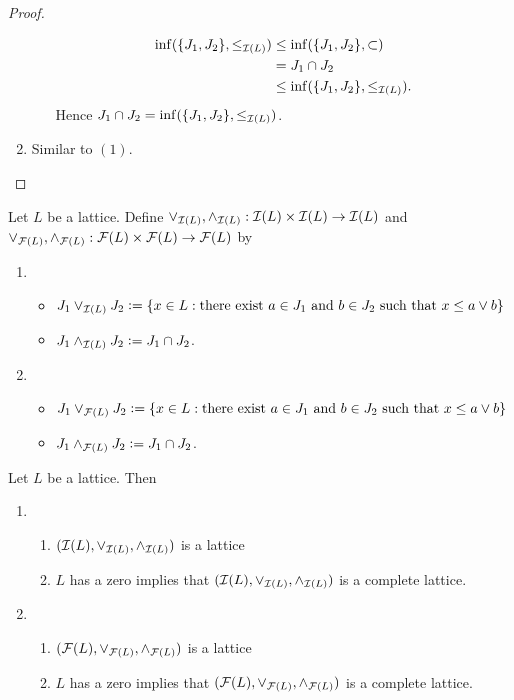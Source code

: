 \documentclass{book}
\begin{document}
\begin{proof}
\begin{enumerate}
\begin{enumerate}
				\begin{align*}
					\inf (\{J_1, J_2\}, \leq_{\mathcal{I}(L)})
					& \leq \inf (\{J_1, J_2\}, \subset) \\
					& = J_1 \cap J_2 \\
					& \leq \inf (\{J_1, J_2\}, \leq_{\mathcal{I}(L)}).
				\end{align*} 
				Hence $J_1 \cap J_2 = \inf (\{J_1, J_2\}, \leq_{\mathcal{I}(L)})$. 
			\end{enumerate}
			\item Similar to $(1)$.  
		\end{enumerate}
	\end{proof}
	
	\begin{defn}
		Let $L$ be a lattice. Define $\vee_{\mathcal{I}(L)}, \wedge_{\mathcal{I}(L)}: \mathcal{I}(L) \times \mathcal{I}(L) \rightarrow \mathcal{I}(L)$ and $\vee_{\mathcal{F}(L)}, \wedge_{\mathcal{F}(L)}: \mathcal{F}(L) \times \mathcal{F}(L) \rightarrow \mathcal{F}(L)$ by 
		\begin{enumerate}
			\item 
			\begin{itemize}
				\item $J_1 \vee_{\mathcal{I}(L)} J_2 \vcentcolon= \{x \in L: \text{there exist $a \in J_1$ and $b \in J_2$ such that $x \leq a \vee b$} \}$
				\item $J_1 \wedge_{\mathcal{I}(L)} J_2 \vcentcolon= J_1 \cap J_2$. 
			\end{itemize}
			\item {}
			\begin{itemize}
				\item $J_1 \vee_{\mathcal{F}(L)} J_2 \vcentcolon= \{x \in L: \text{there exist $a \in J_1$ and $b \in J_2$ such that $x \leq a \vee b$} \}$
				\item $J_1 \wedge_{\mathcal{F}(L)} J_2 \vcentcolon= J_1 \cap J_2$. 
			\end{itemize}
		\end{enumerate}
	\end{defn}
	
	\begin{ex}
		Let $L$ be a lattice. Then 
		\begin{enumerate}
			\item 
			\begin{enumerate}
				\item $(\mathcal{I}(L), \vee_{\mathcal{I}(L)}, \wedge_{\mathcal{I}(L)})$ is a lattice 
				\item $L$ has a zero implies that $(\mathcal{I}(L), \vee_{\mathcal{I}(L)}, \wedge_{\mathcal{I}(L)})$ is a complete lattice.
			\end{enumerate}
			\item 
			\begin{enumerate}
				\item $(\mathcal{F}(L), \vee_{\mathcal{F}(L)}, \wedge_{\mathcal{F}(L)})$ is a lattice 
				\item $L$ has a zero implies that $(\mathcal{F}(L), \vee_{\mathcal{F}(L)}, \wedge_{\mathcal{F}(L)})$ is a complete lattice.
			\end{enumerate}
		\end{enumerate}
	\end{ex}
	
\end{document}
